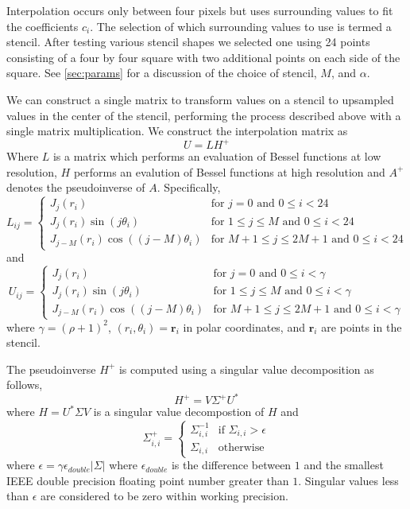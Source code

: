 \documentclass{report}
\newcommand{\rr}[0]{\mathbf{r}}
\begin{document}
Interpolation occurs only between four pixels but uses surrounding values to fit the coefficients $c_i$. The selection of which surrounding values to use is termed a stencil. After testing various stencil shapes we selected one using 24 points consisting of a four by four square with two additional points on each side of the square. See \ref{sec:params} for a discussion of the choice of stencil, $M$, and $\alpha$.

We can construct a single matrix to transform values on a stencil to upsampled values in the center of the stencil, performing the process described above with a single matrix multiplication. We construct the interpolation matrix as
\[
U = L H^{+}
\]
Where $L$ is a matrix which performs an evaluation of Bessel functions at low resolution, $H$ performs an evalution of Bessel functions at high resolution and $A^{+}$ denotes the pseudoinverse of $A$. Specifically,
\[
L_{ij} =\begin{cases}
J_{j}(r_{i}) & \text{for } j = 0 \text{ and } 0 \le i < 24\\
J_{j}(r_{i}) \sin{(j \theta_{i})} & \text{for } 1 \le j \le M \text{ and } 0 \le i < 24\\
J_{j-M}(r_{i}) \cos{((j-M) \theta_{i})} & \text{for } M+1 \le j \le 2M+1 \text{ and } 0 \le i < 24
\end{cases}
\]
and
\[
U_{ij} =\begin{cases}
J_{j}(r_{i}) & \text{for } j = 0 \text{ and } 0 \le i < \gamma\\
J_{j}(r_{i}) \sin{(j \theta_{i})} & \text{for } 1 \le j \le M \text{ and } 0 \le i < \gamma\\
J_{j-M}(r_{i}) \cos{((j-M) \theta_{i})} & \text{for } M+1 \le j \le 2M+1 \text{ and } 0 \le i < \gamma
\end{cases}
\]
where $\gamma = (\rho + 1)^{2}$, $(r_{i},\theta_{i}) = \rr_{i}$ in polar coordinates, and $\rr_{i}$ are points in the stencil.

The pseudoinverse $H^{+}$ is computed using a singular value decomposition as follows,
\[
H^{+} = V \Sigma^{+} U^{*}
\]
where $H = U^{*} \Sigma V$ is a singular value decompostion of $H$ and
\[
\Sigma^{+}_{i,i} =\begin{cases}
\Sigma_{i,i}^{-1} & \text{if }\Sigma_{i,i} > \epsilon\\
\Sigma_{i,i} & \text{otherwise}
\end{cases}
\]
where $\epsilon = \gamma \epsilon_{double} \vert \Sigma \vert$ where $\epsilon_{double}$ is the difference between $1$ and the smallest IEEE double precision floating point number greater than $1$. Singular values less than $\epsilon$ are considered to be zero within working precision.
\end{document}
